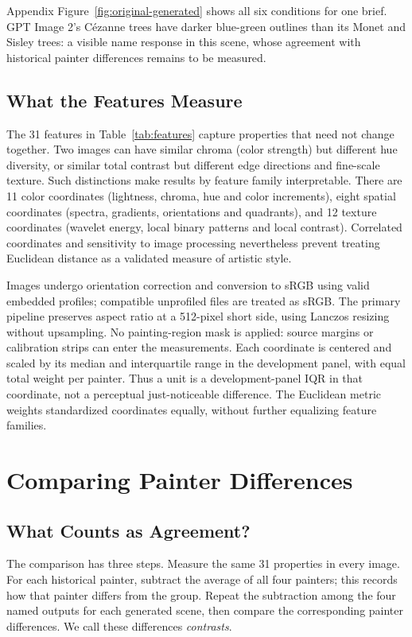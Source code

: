 Appendix Figure~\ref{fig:original-generated} shows all six conditions for one brief.
GPT Image 2's C\'ezanne trees have darker blue-green outlines than its Monet
and Sisley trees: a visible name response in this scene, whose agreement with
historical painter differences remains to be measured.



\subsection{What the Features Measure}\label{sec:features}
The 31 features in Table~\ref{tab:features} capture properties that need not
change together. Two images can have similar chroma (color strength) but different
hue diversity, or similar total contrast but different edge directions and
fine-scale texture. Such distinctions make results by feature family interpretable.
There are 11 color coordinates (lightness, chroma, hue and color increments),
eight spatial coordinates (spectra, gradients, orientations and quadrants),
and 12 texture coordinates (wavelet energy, local binary patterns and local contrast).
Correlated coordinates and sensitivity to image processing nevertheless prevent
treating Euclidean distance as a validated measure of artistic style.



Images undergo orientation correction and conversion to sRGB using valid
embedded profiles; compatible unprofiled files are treated as sRGB. The primary
pipeline preserves aspect ratio at a 512-pixel short side, using Lanczos resizing
without upsampling. No painting-region mask is applied: source margins or
calibration strips can enter the measurements. Each coordinate is centered and scaled by its
median and interquartile range in the development panel, with equal total
weight per painter. Thus a unit is a development-panel IQR in that coordinate,
not a perceptual just-noticeable difference. The Euclidean metric weights
standardized coordinates equally, without further equalizing feature families.



\section{Comparing Painter Differences}\label{sec:method}
\subsection{What Counts as Agreement?}\label{sec:contrast-intuition}
The comparison has three steps. Measure the same 31 properties in every image.
For each historical painter, subtract the average of all four painters; this
records how that painter differs from the group. Repeat the subtraction among
the four named outputs for each generated scene, then compare the corresponding
painter differences. We call these differences \emph{contrasts}.

